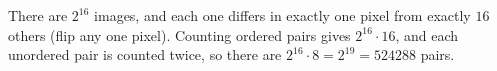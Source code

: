 There are $2^{16}$ images, and each one differs in exactly one pixel from exactly $16$ others (flip any one pixel). Counting ordered pairs gives $2^{16}\cdot16$, and each unordered pair is counted twice, so there are $2^{16}\cdot8=2^{19}=\boxed{524288}$ pairs.
